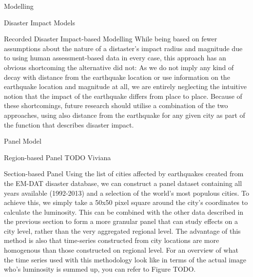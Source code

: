 \documentclass[12pt,fleqn,leqno,letterpaper]{article}
\begin{document}
\begin{section}{Modelling}
\begin{subsection}{Disaster Impact Models}
\begin{subsubsection}{Recorded Disaster Impact-based Modelling}
      While being based on fewer assumptions about the nature of a distaster's impact radius and magnitude due to using human assessment-based data in every case, this approach has an obvious shortcoming the alternative did not: As we do not imply any kind of decay with distance from the earthquake location or use information on the earthquake location and magnitude at all, we are entirely neglecting the intuitive notion that the impact of the earthquake differs from place to place. Because of these shortcomings, future research should utilise a combination of the two approaches, using also distance from the earthquake for any given city as part of the function that describes disaster impact.
    \end{subsubsection}
  \end{subsection}
  \begin{subsection}{Panel Model}
    \begin{subsubsection}{Region-based Panel}
      TODO Viviana
    \end{subsubsection}
    \begin{subsubsection}{Section-based Panel}
      Using the list of cities affected by earthquakes created from the EM-DAT disaster database, we can construct a panel dataset containing all years available (1992-2013) and a selection of the world's most populous cities. To achieve this, we simply take a 50x50 pixel square around the city's coordinates to calculate the luminosity. This can be combined with the other data described in the previous section to form a more granular panel that can study effects on a city level, rather than the very aggregated regional level. The advantage of this method is also that time-series constructed from city locations are more homogenous than those constructed on regional level. For an overview of what the time series used with this methodology look like in terms of the actual image who's luminosity is summed up, you can refer to Figure TODO.\\
      \begin{figure}[t!]
        \centering

\end{figure}
\end{subsubsection}
\end{subsection}
\end{section}
\end{document}
